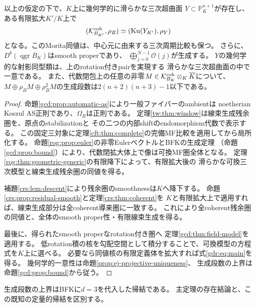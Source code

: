 \begin{theorem}[一般次元の中心三次非可換変形の可換復元]
\label{gdr:thm:generic}
以上の仮定の下で、$K$上に幾何学的に滑らかな三次超曲面
$Y\subset\mathbb P^{n+1}_K$が存在し、ある有限拡大$K'/K$上で
\begin{equation}\label{gdr:eq:main}
 (\mathcal K^{\rm coh}_{B_{K'}},\rho_B)
 \simeq(\operatorname{Ku}(Y_{K'}),\rho_Y)
\end{equation}
となる。このMorita同値は、中心元に由来する三次周期比較も保つ。
さらに、$D^b(\operatorname{qgr}B_K)$はsmooth properであり、
$\bigoplus_{j=0}^{N-1}\mathcal O(j)$が生成する。
$Y$の幾何学的な射影同型類は、上のrotation付きpairを実現する
滑らかな三次超曲面の中で一意である。
また、代数閉包上の任意の非零$M\in\mathcal K^{\rm coh}_{B_K}\otimes_K\overline K$について、
$M\oplus\rho_BM\oplus\rho_B^2M$の生成段数は$2(n+2)(n+3)-1$以下である。
\end{theorem}

\begin{proof}
命題\ref{gcd:prop:automatic-as}により一般ファイバーのambientは
noetherian Koszul AS正則であり、$\Omega_R$は正則である。
定理\ref{tw:thm:window}は線束生成残余圏を、原点のstabilizationと
その二つの内部shiftのendomorphism代数で表示する。
この固定三対象に定理\ref{cft:thm:complete}の完備MF比較を適用してから局所化する。
命題\ref{rog:prop:euler}の非零EulerベクトルとBFKの生成定理
（命題\ref{gcd:prop:bound}）により、代数閉拡大体上で像は可換MF圏全体となる。
定理\ref{rog:thm:geometric-generic}の有限降下によって、有限拡大後の
滑らかな可換三次模型と線束生成残余圏の同値を得る。

補題\ref{crs:lem:descent}により残余圏のsmoothnessは$K$へ降下する。
命題\ref{crs:prop:residual-smooth}と定理\ref{crs:thm:coherent}を
$K$と有限拡大上で適用すれば、線束生成部分は全coherent導来圏に一致する。
これにより全coherent残余圏の同値と、全体のsmooth proper性・有限線束生成を得る。

最後に、得られたsmooth properなrotation付き圏へ
定理\ref{gcd:thm:field-model}を適用する。
低rotation積の核を勾配空間として積分することで、可換模型の方程式を$K$上に選べる。
必要なら同値核の有限定義体を拡大すれば式\eqref{gdr:eq:main}を得る。
幾何学的一意性は命題\ref{prop:ej-projective-uniqueness}、
生成段数の上界は命題\ref{gcd:prop:bound}から従う。
\end{proof}

生成段数の上界はBFK\cite[Theorem~5.15]{GCDBFK}に$d=3$を代入した帰結である。
主定理の存在結論と、この既知の定量的帰結を区別する。

